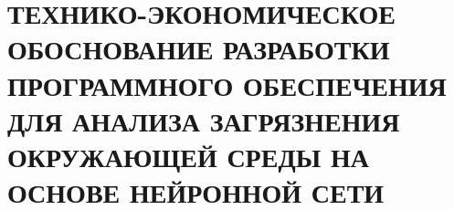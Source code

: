 \newcommand{\rub}{руб}

\section{ТЕХНИКО-ЭКОНОМИЧЕСКОЕ ОБОСНОВАНИЕ РАЗРАБОТКИ ПРОГРАММНОГО ОБЕСПЕЧЕНИЯ ДЛЯ АНАЛИЗА ЗАГРЯЗНЕНИЯ ОКРУЖАЮЩЕЙ СРЕДЫ НА ОСНОВЕ НЕЙРОННОЙ СЕТИ}









